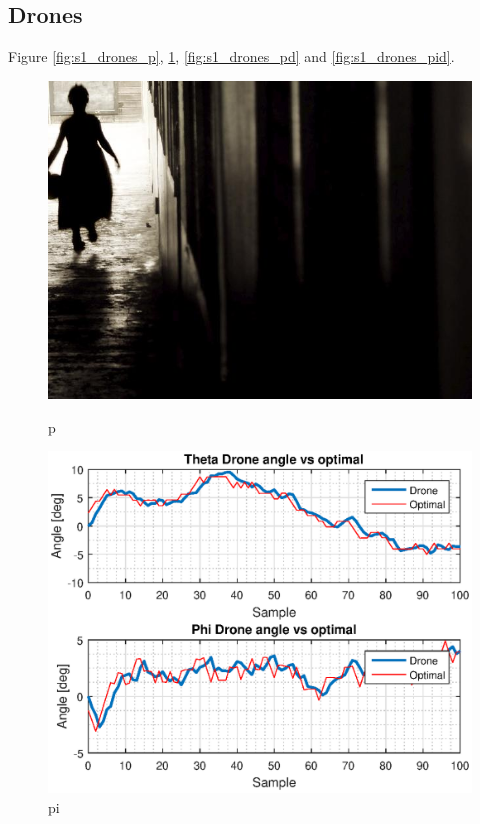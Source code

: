 \subsection{Drones}

Figure \ref{fig:s1_drones_p}, \ref{fig:s1_drones_pi}, \ref{fig:s1_drones_pd} and \ref{fig:s1_drones_pid}.
\begin{figure}[H]
\begin{minipage}[t]{0.45\textwidth}
\includegraphics[width=\linewidth]{figures/randomfigure.jpg}
\caption{p}
\label{fig:s1_drones_p}
\end{minipage}
\hspace{\fill}
\begin{minipage}[t]{0.45\textwidth}
\includegraphics[width=\linewidth]{figures/s1_pi_drone_theta_phi_optimal.eps}
\caption{pi}
\label{fig:s1_drones_pi}
\end{minipage}


\end{figure}
